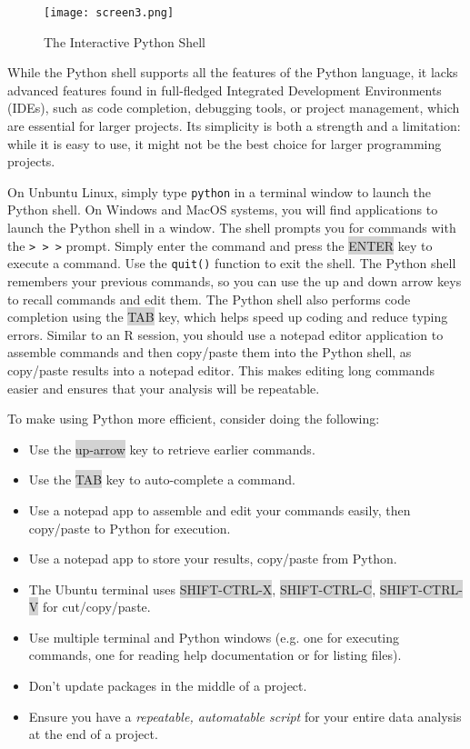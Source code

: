 \begin{figure}
\centering
\texttt{[image: screen3.png]}
\caption{The Interactive Python Shell}
\label{fig:pythonshell}
\end{figure}

While the Python shell supports all the features of the Python language, it lacks advanced features found in full-fledged Integrated Development Environments (IDEs), such as code completion, debugging tools, or project management, which are essential for larger projects. Its simplicity is both a strength and a limitation: while it is easy to use, it might not be the best choice for larger programming projects.

On Unbuntu Linux, simply type \texttt{python} in a terminal window to launch the Python shell. On Windows and MacOS systems, you will find applications to launch the Python shell in a window. The shell prompts you for commands with the \texttt{> > >} prompt. Simply enter the command and press the {\footnotesize\colorbox{lightgray}{ENTER}} key to execute a command. Use the \texttt{quit()} function to exit the shell. The Python shell remembers your previous commands, so you can use the up and down arrow keys to recall commands and edit them. The Python shell also performs code completion using the {\footnotesize\colorbox{lightgray}{TAB}} key, which helps speed up coding and reduce typing errors. Similar to an R session, you should use a notepad editor application to assemble commands and then copy/paste them into the Python shell, as copy/paste results into a notepad editor. This makes editing long commands easier and ensures that your analysis will be repeatable.

\begin{infobox}

To make using Python more efficient, consider doing the following:

\begin{itemize}
    \item Use the {\footnotesize\colorbox{lightgray}{up-arrow}} key to retrieve earlier commands.
    \item Use the {\footnotesize\colorbox{lightgray}{TAB}} key to auto-complete a command.
    \item Use a notepad app to assemble and edit your commands easily, then copy/paste to Python for execution.
    \item Use a notepad app to store your results, copy/paste from Python.
    \item The Ubuntu terminal uses {\footnotesize\colorbox{lightgray}{SHIFT-CTRL-X}}, {\footnotesize\colorbox{lightgray}{SHIFT-CTRL-C}}, {\footnotesize\colorbox{lightgray}{SHIFT-CTRL-V}} for cut/copy/paste.
    \item Use multiple terminal and Python windows (e.g. one for executing commands, one for reading help documentation or for listing files).
    \item Don't update packages in the middle of a project.
    \item Ensure you have a \emph{repeatable, automatable script} for your entire data analysis at the end of a project.
\end{itemize}
\end{infobox}

